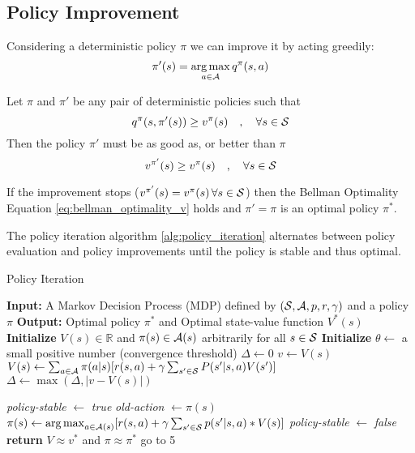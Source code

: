 \subsection{Policy Improvement}
Considering a deterministic policy $\pi$ we can improve it by acting greedily:
\[\pi'(s) = \operatorname*{arg\,max}_{a \in \mathcal{A}}q^\pi(s,a)\]

\begin{theorem}
    \label{th:policy_improvement}
    Let $\pi$ and $\pi'$ be any pair of deterministic policies such that
    \begin{equation*}
    q^\pi(s,\pi'(s)) \ge v^\pi(s) \quad, \quad \forall s \in \mathcal{S}
    \end{equation*}
    Then the policy $\pi'$ must be as good as, or better than $\pi$
    \begin{equation}
    v^{\pi'}(s) \ge v^\pi(s) \quad, \quad \forall s \in \mathcal{S}
    \end{equation}
\end{theorem}

If the improvement stops ($v^{\pi'}(s) = v^\pi(s) \, \forall s \in \mathcal{S}$) then the Bellman Optimality Equation \eqref{eq:bellman_optimality_v}
holds and $\pi' = \pi$ is an optimal policy $\pi^*$.

The policy iteration algorithm \ref{alg:policy_iteration} alternates between policy evaluation and policy improvements until the policy is stable and
thus optimal.

\begin{algorithm}[H]
    \caption{Policy Iteration}
    \label{alg:policy_iteration}
    \begin{algorithmic}[1]
        \STATE \textbf{Input:} A Markov Decision Process (MDP) defined by $(\mathcal{S}, \mathcal{A}, p, r, \gamma)$ and a policy $\pi$
        \STATE \textbf{Output:} Optimal policy $\pi^*$ and Optimal state-value function $V^*(s)$
        \STATE \textbf{Initialize} $V(s) \in \mathbb{R}$ and $\pi(s) \in \mathcal{A}(s)$ arbitrarily for all $s \in \mathcal{S}$
        \STATE \textbf{Initialize} $\theta \gets$ a small positive number (convergence threshold)
        \REPEAT
            \STATE $\Delta \gets 0$
                \STATE $v \gets V(s)$
                \STATE $V(s) \gets \sum_{a \in \mathcal{A}} \pi(a|s) [r(s,a) + \gamma \sum_{s' \in \mathcal{S}} P(s' | s, a) V(s')]$
                \STATE $\Delta \gets \max(\Delta, |v - V(s)|)$
            \ENDFOR
        \UNTIL{$\Delta < \theta$}
        
        \STATE \textit{policy-stable} $\gets$ \textit{true}
            \STATE \textit{old-action} $\gets \pi(s)$
            \STATE $\pi(s) \gets \operatorname*{arg\,max}_{a \in \mathcal{A}(s)}[r(s,a) + \gamma \sum_{s' \in \mathcal{S}}p(s'|s,a) * V(s)]$
                \STATE \textit{policy-stable} $\gets$ \textit{false}
            \ENDIF
        \ENDFOR
            \STATE \textbf{return} $V \approx v^*$ and $\pi \approx \pi^*$
        \ELSE
            \STATE go to 5
        \ENDIF
    \end{algorithmic}
\end{algorithm}

